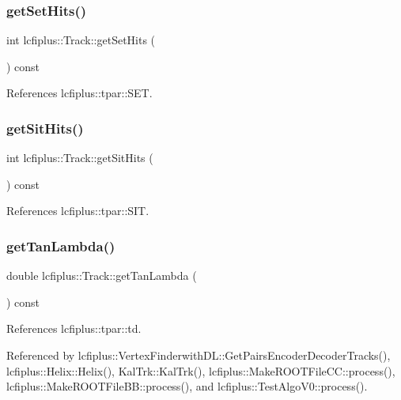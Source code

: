\subsubsection{get\+Set\+Hits()}
{\footnotesize\ttfamily int lcfiplus\+::\+Track\+::get\+Set\+Hits (\begin{DoxyParamCaption}{ }\end{DoxyParamCaption}) const\hspace{0.3cm}{\ttfamily [inline]}}



References lcfiplus\+::tpar\+::\+S\+ET.

\mbox{\label{classlcfiplus_1_1Track_a2483e3d699ef7f3da0ee1b2544d103ea}} 
\subsubsection{get\+Sit\+Hits()}
{\footnotesize\ttfamily int lcfiplus\+::\+Track\+::get\+Sit\+Hits (\begin{DoxyParamCaption}{ }\end{DoxyParamCaption}) const\hspace{0.3cm}{\ttfamily [inline]}}



References lcfiplus\+::tpar\+::\+S\+IT.

\mbox{\label{classlcfiplus_1_1Track_afaded749067badedc229443d3b7d4dc7}} 
\subsubsection{get\+Tan\+Lambda()}
{\footnotesize\ttfamily double lcfiplus\+::\+Track\+::get\+Tan\+Lambda (\begin{DoxyParamCaption}{ }\end{DoxyParamCaption}) const\hspace{0.3cm}{\ttfamily [inline]}}



References lcfiplus\+::tpar\+::td.



Referenced by lcfiplus\+::\+Vertex\+Finderwith\+D\+L\+::\+Get\+Pairs\+Encoder\+Decoder\+Tracks(), lcfiplus\+::\+Helix\+::\+Helix(), Kal\+Trk\+::\+Kal\+Trk(), lcfiplus\+::\+Make\+R\+O\+O\+T\+File\+C\+C\+::process(), lcfiplus\+::\+Make\+R\+O\+O\+T\+File\+B\+B\+::process(), and lcfiplus\+::\+Test\+Algo\+V0\+::process().

